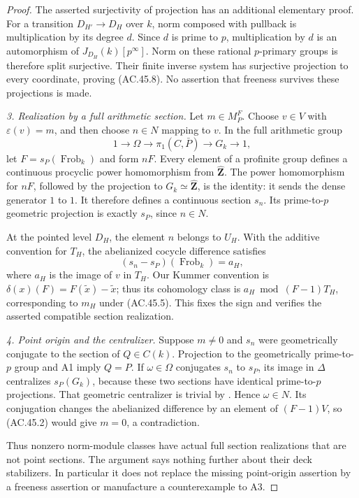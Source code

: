 \begin{proof}
The asserted surjectivity of projection has an
additional elementary proof. For a transition
$D_{H'}\to D_H$ over $k$, norm composed with
pullback is multiplication by its degree $d$.
Since $d$ is prime to $p$, multiplication by $d$
is an automorphism of $J_{D_H}(k)[p^\infty]$.
Norm on these rational $p$-primary groups is
therefore split surjective. Their finite inverse
system has surjective projection to every
coordinate, proving (AC.45.8). No assertion that
freeness survives these projections is made.

\emph{3. Realization by a full arithmetic section.}
Let $m\in M_P^F$. Choose $v\in V$ with
$\varepsilon(v)=m$, and then choose $n\in N$
mapping to $v$. In the full arithmetic group
\[
        1\longrightarrow\Omega\longrightarrow\pi_1(C,\bar P)
          \longrightarrow G_k\longrightarrow1,
\]
let $F=s_P(\operatorname{Frob}_k)$ and form
$nF$. Every element of a profinite group defines
a continuous procyclic power homomorphism from
$\widehat{\mathbf Z}$. The power homomorphism for
$nF$, followed by the projection to
$G_k\simeq\widehat{\mathbf Z}$, is the identity:
it sends the dense generator $1$ to $1$.
It therefore defines a continuous section $s_n$.
Its prime-to-$p$ geometric projection is exactly
$s_P$, since $n\in N$.

At the pointed level $D_H$, the element $n$ belongs
to $U_H$. With the additive convention for
$T_H$, the abelianized cocycle difference satisfies
\[
      (s_n-s_P)(\operatorname{Frob}_k)=a_H,
                                                        \tag{AC.45.7}
\]
where $a_H$ is the image of $v$ in $T_H$.
Our Kummer convention is
$\delta(x)(F)=F(\widetilde x)-\widetilde x$;
thus its cohomology class is
$a_H\bmod(F-1)T_H$, corresponding to $m_H$
under (AC.45.5). This fixes the sign and verifies
the asserted compatible section realization.

\emph{4. Point origin and the centralizer.}
Suppose $m\ne0$ and $s_n$ were geometrically
conjugate to the section of $Q\in C(k)$.
Projection to the geometrically prime-to-$p$
group and A1 imply $Q=P$.
If $\omega\in\Omega$ conjugates $s_n$ to $s_P$,
its image in $\Delta$ centralizes $s_P(G_k)$,
because these two sections have identical
prime-to-$p$ projections. That geometric
centralizer is trivial by
\cite[Lemma~1.7]{AR_ST2009}. Hence $\omega\in N$.
Its conjugation changes the abelianized difference
by an element of $(F-1)V$, so (AC.45.2) would
give $m=0$, a contradiction.

Thus nonzero norm-module classes have actual full
section realizations that are not point sections.
The argument says nothing further about their
deck stabilizers. In particular it does not replace
the missing point-origin assertion by a freeness
assertion or manufacture a counterexample to A3.
\end{proof}

